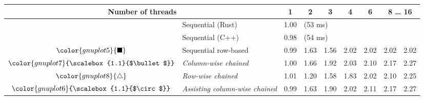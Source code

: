 \begin{tabular}{clrrrrrrr}
\toprule
\multicolumn{2}{c}{\textbf{Number of threads}} & \multicolumn{1}{c}{\textbf{ 1 }} & \multicolumn{1}{c}{\textbf{ 2 }} & \multicolumn{1}{c}{\textbf{ 3 }} & \multicolumn{1}{c}{\textbf{ 4 }} & \multicolumn{1}{c}{\textbf{ 6 }} & \multicolumn{2}{c}{\textbf{ 8 } \dots \textbf{ 16 }} \\
\midrule
& Sequential (Rust) & \multicolumn{1}{r}{ 1.00 } & \multicolumn{ 6 }{l}{(53 ms)} \\
& Sequential (C++) & \multicolumn{1}{r}{ 0.98 } & \multicolumn{ 6 }{l}{(54 ms)} \\
\rowcolor{gnuplot5!10}$\color{gnuplot5}{\blacksquare}$ & Sequential row-based & \cellcolor{gnuplot5!10} 0.99 & \cellcolor{gnuplot5!10} 1.63 & \cellcolor{gnuplot5!10} 1.56 & \cellcolor{gnuplot5!10} 2.02 & \cellcolor{gnuplot5!10} 2.02 & \cellcolor{gnuplot5!10} 2.02 & \cellcolor{gnuplot5!10} 2.02 \\
\rowcolor{gnuplot7!30}$\color{gnuplot7}{\scalebox{1.1}{$\bullet$}}$ & \textit{Column-wise chained} & \cellcolor{gnuplot7!30} 1.00 & \cellcolor{gnuplot7!30} 1.66 & \cellcolor{gnuplot7!30} 1.92 & \cellcolor{gnuplot7!30} 2.03 & \cellcolor{gnuplot7!30} 2.10 & \cellcolor{gnuplot7!30} 2.17 & \cellcolor{gnuplot7!30} 2.27 \\
\rowcolor{gnuplot8!30}$\color{gnuplot8}{\triangle}$ & \textit{Row-wise chained} & \cellcolor{gnuplot8!30} 1.01 & \cellcolor{gnuplot8!30} 1.20 & \cellcolor{gnuplot8!30} 1.58 & \cellcolor{gnuplot8!30} 1.83 & \cellcolor{gnuplot8!30} 2.02 & \cellcolor{gnuplot8!30} 2.10 & \cellcolor{gnuplot8!30} 2.25 \\
\rowcolor{gnuplot6!30}$\color{gnuplot6}{\scalebox{1.1}{$\circ$}}$ & \textit{Assisting column-wise chained} & \cellcolor{gnuplot6!30} 0.99 & \cellcolor{gnuplot6!30} 1.63 & \cellcolor{gnuplot6!30} 1.90 & \cellcolor{gnuplot6!30} 2.02 & \cellcolor{gnuplot6!30} 2.11 & \cellcolor{gnuplot6!30} 2.17 & \cellcolor{gnuplot6!30} 2.27 \\
\bottomrule
\end{tabular}
